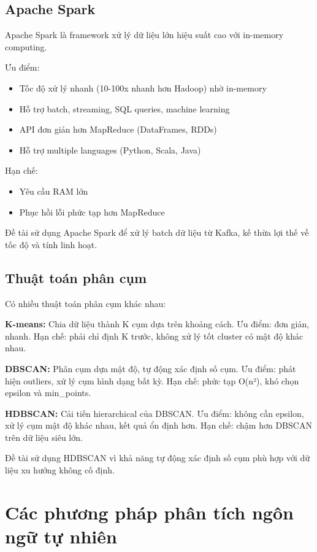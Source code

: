 \subsection{Apache Spark}

Apache Spark là framework xử lý dữ liệu lớn hiệu suất cao với in-memory computing.

Ưu điểm:
\begin{itemize}
    \item Tốc độ xử lý nhanh (10-100x nhanh hơn Hadoop) nhờ in-memory
    \item Hỗ trợ batch, streaming, SQL queries, machine learning
    \item API đơn giản hơn MapReduce (DataFrames, RDDs)
    \item Hỗ trợ multiple languages (Python, Scala, Java)
\end{itemize}

Hạn chế:
\begin{itemize}
    \item Yêu cầu RAM lớn
    \item Phục hồi lỗi phức tạp hơn MapReduce
\end{itemize}

Đề tài sử dụng Apache Spark để xử lý batch dữ liệu từ Kafka, kế thừa lợi thế về tốc độ và tính linh hoạt.

\subsection{Thuật toán phân cụm}

Có nhiều thuật toán phân cụm khác nhau:

\textbf{K-means:} Chia dữ liệu thành K cụm dựa trên khoảng cách. Ưu điểm: đơn giản, nhanh. Hạn chế: phải chỉ định K trước, không xử lý tốt cluster có mật độ khác nhau.

\textbf{DBSCAN:} Phân cụm dựa mật độ, tự động xác định số cụm. Ưu điểm: phát hiện outliers, xử lý cụm hình dạng bất kỳ. Hạn chế: phức tạp O(n²), khó chọn epsilon và min\_points.

\textbf{HDBSCAN:} Cải tiến hierarchical của DBSCAN. Ưu điểm: không cần epsilon, xử lý cụm mật độ khác nhau, kết quả ổn định hơn. Hạn chế: chậm hơn DBSCAN trên dữ liệu siêu lớn.

Đề tài sử dụng HDBSCAN vì khả năng tự động xác định số cụm phù hợp với dữ liệu xu hướng không cố định.

\section{Các phương pháp phân tích ngôn ngữ tự nhiên}


